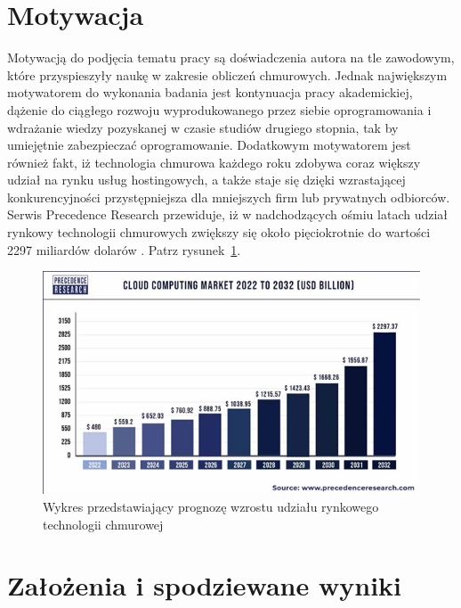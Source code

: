 \documentclass[12pt,oneside]{book}
\newcommand{\captionvspace}{\vspace{6pt}}
\begin{document}
    \section{Motywacja}

    Motywacją do podjęcia tematu pracy są doświadczenia autora na tle zawodowym, które przyspieszyły naukę w zakresie obliczeń chmurowych. Jednak największym motywatorem do wykonania badania jest kontynuacja pracy akademickiej, dążenie do ciągłego rozwoju wyprodukowanego przez siebie oprogramowania i wdrażanie wiedzy pozyskanej w czasie studiów drugiego stopnia, tak by umiejętnie zabezpieczać oprogramowanie. Dodatkowym motywatorem jest również fakt, iż technologia chmurowa każdego roku zdobywa coraz większy udział na rynku usług hostingowych, a także staje się dzięki wzrastającej konkurencyjności przystępniejsza dla mniejszych firm lub prywatnych odbiorców. Serwis Precedence Research przewiduje, iż w nadchodzących ośmiu latach udział rynkowy technologii chmurowych zwiększy się około pięciokrotnie do wartości 2297 miliardów dolarów \cite{p.research}. Patrz rysunek~\ref{fig:precedence-research}.

    \begin{figure}[ht]
        \centering
        \includegraphics[width=\textwidth]{includes/images/precedence-research.png}
        \captionvspace
        \caption{Wykres przedstawiający prognozę wzrostu udziału rynkowego technologii chmurowej}
        \label{fig:precedence-research}
    \end{figure}


    \section{Założenia i spodziewane wyniki}
\end{document}
